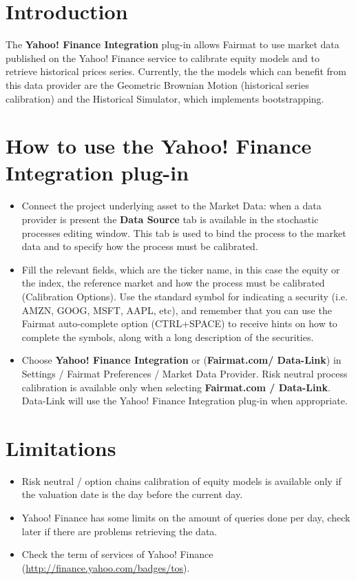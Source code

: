 \newcommand{\pluginName}{Yahoo! Finance Integration}
\newcommand{\pluginVersion}{1.0}





\PluginTitle{\pluginName}{\pluginVersion}

\section{Introduction}
The \textbf{\pluginName} plug-in allows Fairmat to use market data published on the Yahoo! Finance service to calibrate equity models and to retrieve historical prices series. 
Currently, the the models which can benefit from this data provider are the Geometric Brownian Motion (historical series calibration) and the Historical Simulator, which implements bootstrapping.

\section{How to use the \pluginName { } plug-in}
\begin{itemize}
\item Connect the project underlying asset to the Market Data: when a data provider is present the \textbf{Data Source} tab is available in the stochastic processes editing window. This tab is used to bind the process to the market data and to specify how the process must be calibrated. 
\item Fill the relevant fields, which are the ticker name, in this case the equity or the index, the reference market and how the process must be calibrated (Calibration Options). Use the standard symbol for indicating a security  (i.e. AMZN, GOOG, MSFT, AAPL, etc), and remember that you can use the Fairmat auto-complete option (CTRL+SPACE) to receive hints on how to complete the symbols, along with a long description of the securities.
\item Choose \textbf{\pluginName} or (\textbf{Fairmat.com/ Data-Link})  in Settings / Fairmat Preferences / Market Data Provider.  
Risk neutral process calibration  is available only when selecting \textbf{Fairmat.com / Data-Link}. Data-Link will use the \pluginName {} plug-in when appropriate. 
\end{itemize}

\section{Limitations}
\begin{itemize}
\item Risk neutral / option chains calibration of equity models is available only if the valuation date is the day before the current day. 
\item Yahoo! Finance has some limits on the amount of queries done per day, check later if there are problems retrieving the data.
\item Check the term of services of Yahoo! Finance (\url{http://finance.yahoo.com/badges/tos}).
\end{itemize}

